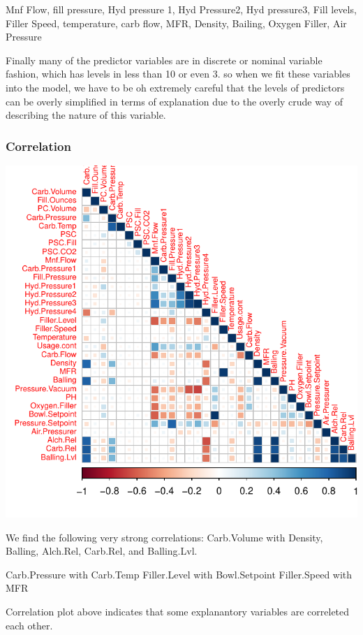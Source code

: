 \documentclass[]{article}
\begin{document}
Mnf Flow, fill pressure, Hyd pressure 1, Hyd Pressure2, Hyd pressure3,
Fill levels, Filler Speed, temperature, carb flow, MFR, Density,
Bailing, Oxygen Filler, Air Pressure

Finally many of the predictor variables are in discrete or nominal
variable fashion, which has levels in less than 10 or even 3. so when we
fit these variables into the model, we have to be oh extremely careful
that the levels of predictors can be overly simplified in terms of
explanation due to the overly crude way of describing the nature of this
variable.

\subsubsection{Correlation}\label{correlation}

\begin{center}\includegraphics{OmerOzeren_GracieHan_Project_2_files/figure-latex/corrgram-1} \end{center}

We find the following very strong correlations: Carb.Volume with
Density, Balling, Alch.Rel, Carb.Rel, and Balling.Lvl.

Carb.Pressure with Carb.Temp Filler.Level with Bowl.Setpoint
Filler.Speed with MFR

Correlation plot above indicates that some explanantory variables are
correleted each other.
\end{document}
